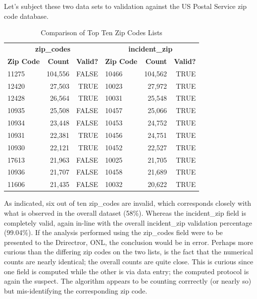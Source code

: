 \documentclass[12pt, titlepage]{article}
\begin{document}
	Let's subject these two data sets to validation against the US Postal Service zip code database.
	 
	\begin{table}[H]
	\centering
	\footnotesize
	\begin{tabular}{lrr@{\hskip 0.5cm}|@{\hskip 0.5cm}lrr}
	\toprule
	\multicolumn{3}{c}{\textbf{zip\_codes}} & \multicolumn{3}{c}{\textbf{incident\_zip}} \\
	\cmidrule(r){1-3} \cmidrule(l){4-6}
	\textbf{Zip Code} & \textbf{Count} & \textbf{Valid?} & \textbf{Zip Code} & \textbf{Count} & \textbf{Valid?} \\
		\midrule
		11275 & 104,556 & FALSE & 10466 & 104,562 & TRUE \\
		12420 & 27,503 & TRUE & 10023 & 27,972 & TRUE \\
		12428 & 26,564 & TRUE & 10031 & 25,548 & TRUE \\
		10935 & 25,508 & FALSE & 10457 & 25,066 & TRUE \\
		10934 & 23,448 & FALSE & 10453 & 24,752 & TRUE \\
		10931 & 22,381 & TRUE & 10456 & 24,751 & TRUE \\
		10930 & 22,121 & TRUE & 10452 & 22,527 & TRUE \\
		17613 & 21,963 & FALSE & 10025 & 21,705 & TRUE \\
		10936 & 21,707 & FALSE & 10458 & 21,689 & TRUE \\
		11606 & 21,435 & FALSE & 10032 & 20,622 & TRUE \\
		\bottomrule
	\end{tabular}
	\caption{Comparison of Top Ten Zip Codes Lists}
	\end{table}

	As indicated, six out of ten zip\_codes are invalid, which corresponds closely with what is observed in the overall dataset (58\%). Whereas the incident\_zip
	field is completely valid, again in-line with the overall incident\_zip validation percentage (99.04\%). If the analysis performed using the zip\_codes field were to be
	presented to the Drirectror, ONL, the conclusion would be in error. Perhaps more curious than the differing zip codes on the two lists, 
	is the fact that the numerical counts are nearly identical;  the overall counts are quite close. This is curious since
	one field is computed while the other is via data entry; the computed protocol is again the suspect. The algorithm appears to be counting corrrectly (or nearly so)
	but mis-identifying the corresponding zip code.
\end{document}
